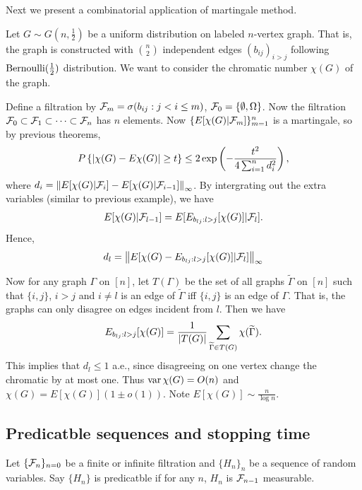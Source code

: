 \documentclass[a4paper]{article}
\begin{document}
Next we present a combinatorial application of martingale method.
\begin{eg}
  Let $G \sim G(n, \frac{1}{2})$ be a uniform distribution on labeled
  $n$-vertex graph. That is, the graph is constructed with
  $\binom{n}{2}$ independent edges $(b_{ij})_{i > j}$ following
  $\operatorname{Bernoulli}(\frac{1}{2})$ distribution.
  We want to consider the chromatic number $\chi (G)$ of the graph.

  Define a filtration by $\mathcal{F}_m = \sigma(b_{ij}: j < i \leq m)$,
  $\mathcal{F}_0 = \{ \emptyset, \Omega \}$. Now the filtration
  $\mathcal{F}_0 \subset \mathcal{F}_1 \subset \cdots \subset \mathcal{F}_n$ has
  $n$ elements. Now $\{ E[\chi(G) | \mathcal{F}_m] \}_{m=1}^n$ is a martingale,
  so by previous theorems,
  \[
    P \left\{ \left\lvert \chi (G) - E \chi(G)\right\rvert \geq t \right\}
    \leq 2 \exp \left(  - \frac{t^2}{4 \sum_{i=1}^n d_i^2} \right),
  \]
  where $d_i = \left\lVert E [\chi(G) | \mathcal{F}_i] - E [\chi(G) | \mathcal{F}_{i - 1}]\right\rVert_\infty$.
  By intergrating out the extra variables (similar to previous
  example), we have
  \begin{align*}
    E[\chi(G) | \mathcal{F}_{l - 1}] = E[E_{b_{lj} : l > j} [\chi(G)] | \mathcal{F}_l].
  \end{align*}
  Hence,
  \[
    d_l = \left\lVert E [\chi(G) -  E_{b_{lj} : l > j} [\chi(G)] | \mathcal{F}_l]\right\rVert_\infty
  \]

  Now for any graph $\Gamma$ on $[n]$, let $T(\Gamma)$ be the set of all
  graphs $\tilde{\Gamma}$ on $[n]$ such that $\{i, j\}$, $i > j$ and
  $i \neq l$ is an edge of $\tilde{\Gamma}$ iff $\{i, j\}$ is
  an edge of $\Gamma$. That is, the graphs can only disagree on edges
  incident from $l$. Then we have
  \[
    E_{b_{lj} : l > j} [\chi(G)] = \frac{1}{\left\lvert T(G)\right\rvert} \sum_{\widetilde{\Gamma}
      \in T(G)} \chi (\widetilde{\Gamma}).
  \]
  This implies that $d_l \leq 1$ a.e., since disagreeing on
  one vertex change the chromatic by at most one. Thus $\operatorname{var} \chi(G) = O(n)$
  and $\chi(G) = E [\chi(G)] (1 \pm o(1))$. Note $E [\chi(G)] \sim
    \frac{n}{\log n}$.

\end{eg}

\subsection{Predicatble sequences and stopping time}

\begin{defi}
  Let $\{ \mathcal{F}_n \}_{n = 0}$ be a finite or infinite filtration
  and $\{ H_n \}_n$ be a sequence of random variables.
  Say $\{ H_n \}$ is predicatble if for any $n$,
  $H_n$ is $\mathcal{F}_{n - 1}$ measurable.
\end{defi}
\end{document}
